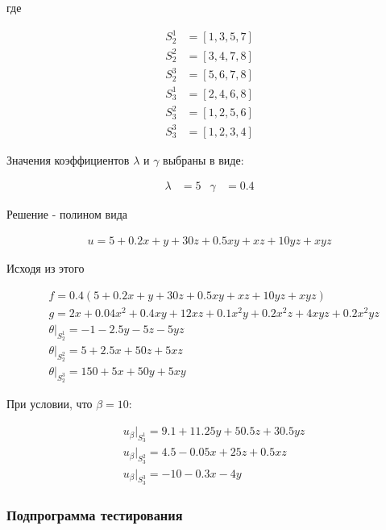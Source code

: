 \documentclass[12pt, a4paper]{article}
\begin{document}
\noindent где

\begin{align*}
  S_2^1 &= \left[ 1, 3, 5, 7 \right] \\
  S_2^2 &= \left[ {3, 4, 7, 8} \right] \\
  S_2^3 &= \left[ {5, 6, 7, 8} \right] \\
  S_3^1 &= \left[ {2, 4, 6, 8} \right] \\
  S_3^2 &= \left[ {1, 2, 5, 6} \right] \\
  S_3^3 &= \left[ {1, 2, 3, 4} \right]
\end{align*}

\noindent Значения коэффициентов $\lambda$ и $\gamma$ выбраны в виде:

\begin{align}
  \lambda &= 5 & \gamma &= 0.4
\end{align}

\noindent Решение - полином вида

\begin{align}
  u = 5 + 0.2x + y + 30z + 0.5xy + xz + 10yz + xyz
\end{align}

\noindent Исходя из этого

\begin{align}
  &f = 0.4(5 + 0.2x + y + 30z + 0.5xy + xz + 10yz + xyz) \\[1ex]
  &g = 2x + 0.04x^2 + 0.4xy + 12xz + 0.1x^2y + 0.2x^2z + 4xyz + 0.2x^2yz \\[1ex]
  &\theta|_{S_2^1} = -1 - 2.5y - 5z - 5yz \\[1ex]
  &\theta|_{S_2^2} = 5 + 2.5x + 50z + 5xz \\[1ex]
  &\theta|_{S_2^3} = 150 + 5x + 50y + 5xy
\end{align}

\noindent При условии, что $\beta = 10$:

\begin{align}
  &u_{\beta}|_{S_3^1} = 9.1 + 11.25y + 50.5z + 30.5yz \\[1ex]
  &u_{\beta}|_{S_3^2} = 4.5 - 0.05x + 25z + 0.5xz \\[1ex]
  &u_{\beta}|_{S_3^3} = -10 - 0.3x - 4y
\end{align}

\subsubsection{Подпрограмма тестирования}

\inputminted[firstline=38, lastline=122]{cpp}{/home/mehandes/c/src/github.com/meha4j/math/pde/fem/sse/test/SolidStateEquationSingleElementTest.cc}
\end{document}

